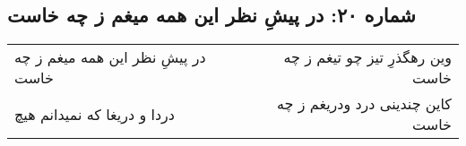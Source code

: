 \begin{center}
\section*{شماره ۲۰: در پیشِ نظر این همه میغم ز چه خاست}
\label{sec:020}
\begin{longtable}{l p{0.5cm} r}
در پیشِ نظر این همه میغم ز چه خاست
&&
وین رهگذرِ تیز چو تیغم ز چه خاست
\\
دردا و دریغا که نمیدانم هیچ
&&
کاین چندینی درد ودریغم ز چه خاست
\\
\end{longtable}
\end{center}
